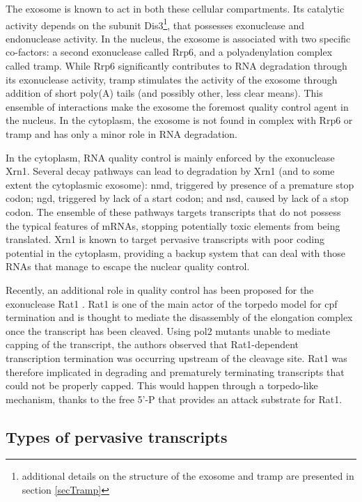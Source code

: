 The exosome is known to act in both these cellular compartments.
Its catalytic activity depends on the subunit Dis3\footnote{additional details on the structure of the exosome and \gls{tramp} are presented in section \ref{secTramp}}, that possesses \TtoF{} exonuclease and endonuclease activity.
In the nucleus, the exosome is associated with two specific co-factors: a second \TtoF{} exonuclease called Rrp6, and a polyadenylation complex called \gls{tramp}.
While Rrp6 significantly contributes to RNA degradation through its exonuclease activity, \gls{tramp} stimulates the activity of the exosome through addition of short poly(A) tails (and possibly other, less clear means).
This ensemble of interactions make the exosome the foremost quality control agent in the nucleus.
In the cytoplasm, the exosome is not found in complex with Rrp6 or \gls{tramp} and has only a minor role in RNA degradation.

In the cytoplasm, RNA quality control is mainly enforced by the \FtoT{} exonuclease Xrn1.
Several decay pathways can lead to degradation by Xrn1 (and to some extent the cytoplasmic exosome): \gls{nmd}, triggered by presence of a premature stop codon; \gls{ngd}, triggered by lack of a start codon; and \gls{nsd}, caused by lack of a stop codon.
The ensemble of these pathways targets transcripts that do not possess the typical features of mRNAs, stopping potentially toxic elements from being translated.
Xrn1 is known to target pervasive transcripts with poor coding potential in the cytoplasm, providing a backup system that can deal with those RNAs that manage to escape the nuclear quality control.

Recently, an additional role in quality control has been proposed for the \FtoT{} exonuclease Rat1 \cite{jimenogonza:2010:yeast}. 
Rat1 is one of the main actor of the torpedo model for \gls{cpf} termination and is thought to mediate the disassembly of the elongation complex once the transcript has been cleaved.
Using \gls{pol2} mutants unable to mediate capping of the transcript, the authors observed that Rat1-dependent transcription termination was occurring upstream of the cleavage site.
Rat1 was therefore implicated in degrading and prematurely terminating transcripts that could not be properly capped.
This would happen through a torpedo-like mechanism, thanks to the free 5'-P that provides an attack substrate for Rat1.

\subsection{Types of pervasive transcripts}

